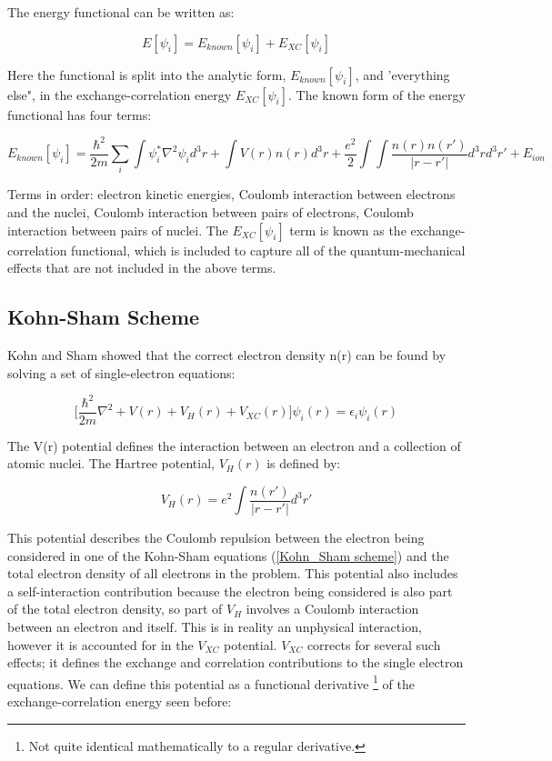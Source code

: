 \documentclass[]{article}
\begin{document}
The energy functional can be written as:

\begin{equation}
E[{\psi_i}] = E_{known}[{\psi_i}] + E_{XC}[{\psi_i}]
\end{equation}

Here the functional is split into the analytic form, $E_{known}[{\psi_i}] $, and 'everything else", in the exchange-correlation energy $E_{XC}[{\psi_i}]$. The known form of the energy functional has four terms:

\begin{equation}
E_{known}[{\psi_i}] = \frac{\hbar^2}{2m}\sum_{i}\int\psi_{i}^{*}\nabla^2\psi_{i}d^3r + \int V(r)n(r)d^3r +\frac{e^2}{2}\int\int\frac{n(r)n(r')}{|r-r'|}d^3rd^3r' + E_{ion}
\end{equation}

Terms in order: electron kinetic energies, Coulomb interaction between electrons and the nuclei, Coulomb interaction between pairs of electrons, Coulomb interaction between pairs of nuclei. The $E_{XC}[{\psi_i}]$ term is known as the exchange-correlation functional, which is included to capture all of the quantum-mechanical effects that are not included in the above terms.

\subsection{Kohn-Sham Scheme}
Kohn and Sham showed that the correct electron density n(r) can be found by solving a set of single-electron equations:

\begin{equation}\label{Kohn_Sham scheme}
\Big[ \frac{\hbar^2}{2m}\nabla^2 + V(r) + V_H(r) + V_{XC}(r) \Big] \psi_{i}(r) = \epsilon_{i}\psi_{i}(r)
\end{equation}

The V(r) potential defines the interaction between an electron and a collection of atomic nuclei. The Hartree potential, $V_{H}(r)$ is defined by:

\begin{equation}
V_{H}(r) = e^2 \int\frac{n(r')}{|r-r'|}d^3r'
\end{equation}

This potential describes the Coulomb repulsion between the electron being considered in one of the Kohn-Sham equations (\ref{Kohn_Sham scheme}) and the total electron density of all electrons in the problem. This potential also includes a self-interaction contribution because the electron being considered is also part of the total electron density, so part of $V_H$ involves a Coulomb interaction between an electron and itself. This is in reality an unphysical interaction, however it is accounted for in the $V_{XC}$ potential. $V_{XC}$ corrects for several such effects; it defines the exchange and correlation contributions to the single electron equations. We can define this potential as a functional derivative \footnote{Not quite identical mathematically to a regular derivative.} of the exchange-correlation energy seen before:
\end{document}
